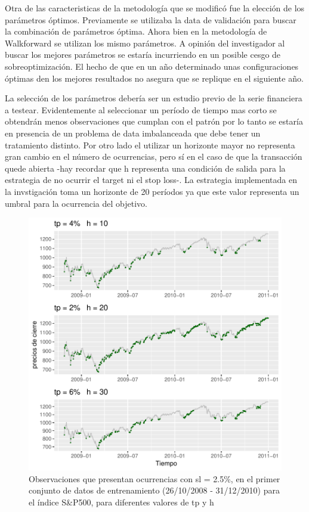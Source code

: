 \documentclass[a4paper,12pt]{Latex/Classes/PhDthesisPSnPDF}
\begin{document}
Otra de las caracteristicas de la metodología que se modificó fue la elección de los parámetros óptimos. Previamente se utilizaba la data de validación para buscar la combinación de parámetros óptima. Ahora bien en la metodología de Walkforward se utilizan los mismo parámetros. A opinión del investigador al buscar los mejores parámetros se estaría incurriendo en un posible cesgo de sobreoptimización. El hecho de que en un año determinado unas configuraciones óptimas den los mejores resultados no asegura que se replique en el siguiente año.

La selección de los parámetros debería ser un estudio previo de la serie financiera a testear. Evidentemente al seleccionar un período de tiempo mas corto se obtendrán menos observaciones que cumplan con el patrón por lo tanto se estaría en presencia de un problema de data imbalanceada que debe tener un tratamiento distinto. Por otro lado el utilizar un horizonte mayor no representa gran cambio en el número de ocurrencias, pero sí en el caso de que la transacción quede abierta -hay recordar que h representa una condición de salida para la estrategia de no ocurrir el target ni el stop loss-. La estrategia implementada en la invstigación toma un horizonte de 20 períodos ya que este valor representa un umbral para la ocurrencia del objetivo.


\begin{figure}[H]
\centering
\includegraphics{main-003}
\caption{Observaciones que presentan ocurrencias con sl = 2.5\%, en el primer conjunto de datos de entrenamiento (26/10/2008 - 31/12/2010) para el índice S\&P500, para diferentes valores de tp y h}
\end{figure}
\end{document}
